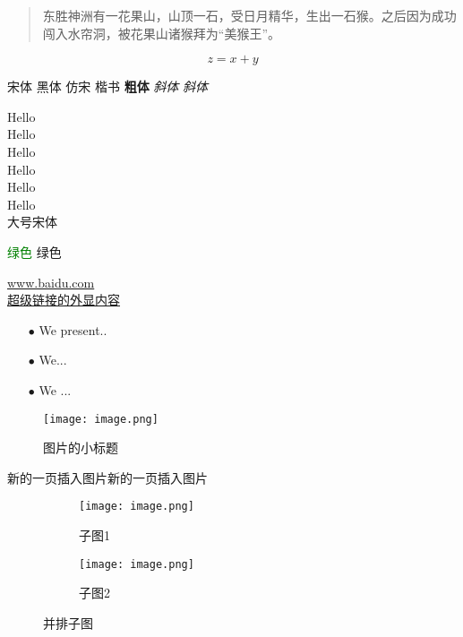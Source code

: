 \documentclass[onecolumn]{article} %
\begin{document}
\begin{quote}
{\kaishu 东胜神洲有一花果山，山顶一石，受日月精华，生出一石猴。之后因为成功闯入水帘洞，被花果山诸猴拜为“美猴王”。}
\end{quote}

\begin{equation}
    z=x+y
    \label{eq1}
\end{equation}

%

{\songti 宋体} {\heiti 黑体} {\fangsong 仿宋} {\kaishu 楷书}
{\bf 粗体} {\it 斜体} {\sl 斜体}

{\tiny Hello}\\
{\scriptsize Hello}\\
{\footnotesize Hello}\\
{\small Hello}\\
{\normalsize Hello}\\
{\large Hello}\\
{\large \songti 大号宋体}

\textcolor{green}{绿色}
\color{orange}{橙色}
\textcolor[rgb]{0,1,0}{绿色}
\color[rgb]{1,0,0}{红色}

\colorbox{red}{\color{black}{红底黑字}}

\url{www.baidu.com}\\
\href{www.baidu.com}{超级链接的外显内容}

\begin{itemize}
\item[$\bullet$] We present..
\item[$\bullet$] We...
\item[$\bullet$] We ...
\end{itemize}

\begin{figure}[htbp] %
    \centering    %
    \texttt{[image: image.png]}  %
    \caption{图片的小标题}    %
    \label{pic1}        %
\end{figure}

\newpage
{新的一页插入图片新的一页插入图片}\\

\begin{figure}[htbp]
    \centering 
    \begin{subfigure}[b]{0.4\textwidth}
        \texttt{[image: image.png]}
        \caption{子图1}
        \label{fig:subfig1}
    \end{subfigure}
    \hfill
    \begin{subfigure}[b]{0.4\textwidth}
        \texttt{[image: image.png]}
        \caption{子图2}
        \label{fig:subfig2}
    \end{subfigure}

    \caption{并排子图}
    \label{fig:subfigures}
\end{figure}
\end{document}
